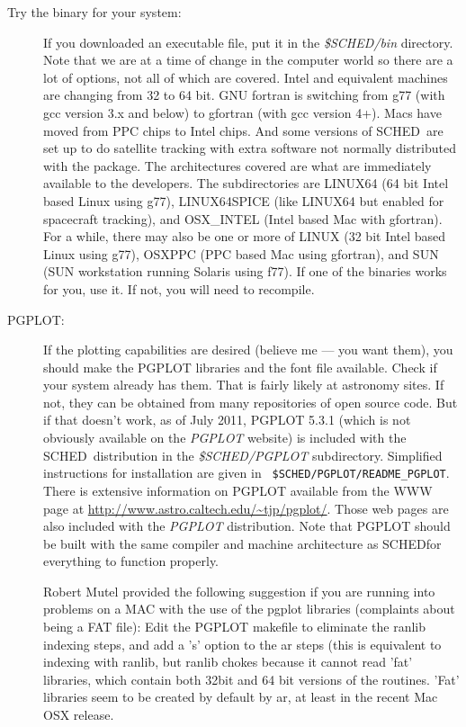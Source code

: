 \documentclass{report}
\newcommand{\sched}{{\sc SCHED}}
\newcommand{\schedb}{{\sc SCHED~}}
\begin{document}
\begin{description}
\item [Try the binary for your system:] If you downloaded an
executable file, put it in the {\sl \$SCHED/bin} directory.  Note that
we are at a time of change in the computer world so there are a lot of
options, not all of which are covered.  Intel and equivalent machines
are changing from 32 to 64 bit.  GNU fortran is switching from g77
(with gcc version 3.x and below) to gfortran (with gcc version 4+).
Macs have moved from PPC chips to Intel chips.  And some versions of
\schedb are set up to do satellite tracking with extra software not
normally distributed with the package.  The architectures covered are
what are immediately available to the developers.  The subdirectories
are LINUX64 (64 bit Intel based Linux using g77), LINUX64SPICE (like
LINUX64 but enabled for spacecraft tracking), and OSX\_INTEL (Intel
based Mac with gfortran).  For a while, there may also be one or more
of LINUX (32 bit Intel based Linux using g77), OSXPPC (PPC based Mac
using gfortran), and SUN (SUN workstation running Solaris using f77).
If one of the binaries works for you, use it.  If not, you will need
to recompile.

\item [{\sc PGPLOT:}] If the plotting capabilities are desired
(believe me --- you want them), you should make the {\sc PGPLOT}
libraries and the font file available.  Check if your system already
has them.  That is fairly likely at astronomy sites.  If not, they can
be obtained from many repositories of open source code.  But if that
doesn't work, as of July 2011, {\sc PGPLOT 5.3.1} (which is not
obviously available on the {\sl PGPLOT} website) is included with
the \schedb distribution in the {\sl \$SCHED/PGPLOT} subdirectory.
Simplified instructions for installation are given in {\tt
\$SCHED/PGPLOT/README\_PGPLOT}.  There is extensive information on {\sc
PGPLOT} available from the WWW page at 
{\href{http://astro.caltech.edu/\~{}tjp/pgplot/}{http://www.astro.caltech.edu/\~{}tjp/pgplot/}}.
Those web pages are also
included with the {\sl PGPLOT} distribution.  Note that {\sc PGPLOT}
should be built with the same compiler and machine architecture as
\sched for everything to function properly.

Robert Mutel provided the following suggestion if you are running into
problems on a MAC with the use of the pgplot libraries (complaints
about being a FAT file): Edit the PGPLOT makefile to eliminate the
ranlib indexing steps, and add a 's' option to the ar steps (this is
equivalent to indexing with ranlib, but ranlib chokes because it
cannot read 'fat' libraries, which contain both 32bit and 64 bit
versions of the routines. 'Fat' libraries seem to be created by
default by ar, at least in the recent Mac OSX release.


\end{description}
\end{document}
